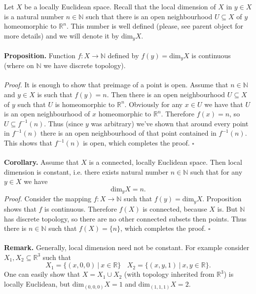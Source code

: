 \documentclass[12pt]{article}
\begin{document}
Let $X$ be a locally Euclidean space. Recall that the local dimension of $X$ in $y\in X$ is a natural number $n\in\mathbb{N}$ such that there is an open neighbourhood $U\subseteq X$ of $y$ homeomorphic to $\mathbb{R}^n$. This number is well defined (please, see parent object for more details) and we will denote it by $\mathrm{dim}_{y}X$.\\ \\
\textbf{Proposition.} Function $f:X\to\mathbb{N}$ defined by $f(y)=\mathrm{dim}_{y}X$ is continuous (where on $\mathbb{N}$ we have discrete topology).\\ \\
\textit{Proof.} It is enough to show that preimage of a point is open. Assume that $n\in\mathbb{N}$ and $y\in X$ is such that $f(y)=n$. Then there is an open neighbourhood $U\subseteq X$ of $y$ such that $U$ is homeomorphic to $\mathbb{R}^n$. Obviously for any $x\in U$ we have that $U$ is an open neighbourhood of $x$ homeomorphic to $\mathbb{R}^n$. Therefore $f(x)=n$, so $U\subseteq f^{-1}(n)$. Thus (since $y$ was arbitrary) we've shown that around every point in $f^{-1}(n)$ there is an open neighbourhood of that point contained in $f^{-1}(n)$. This shows that $f^{-1}(n)$ is open, which completes the proof. $\square$\\ \\
\textbf{Corollary.} Assume that $X$ is a connected, locally Euclidean space. Then local dimension is constant, i.e. there exists natural number $n\in\mathbb{N}$ such that for any $y\in X$ we have
$$\mathrm{dim}_{y}X=n.$$
\textit{Proof.} Consider the mapping $f:X\to\mathbb{N}$ such that $f(y)=\mathrm{dim}_{y}X$. Proposition shows that $f$ is continuous. Therefore $f(X)$ is connected, because $X$ is. But $\mathbb{N}$ has discrete topology, so there are no other connected subsets then points. Thus there is $n\in\mathbb{N}$ such that $f(X)=\{n\}$, which completes the proof. $\square$\\ \\
\textbf{Remark.} Generally, local dimension need not be constant. For example consider $X_1,X_2\subseteq\mathbb{R}^3$ such that
$$X_1=\{(x,0,0)\ |\ x\in\mathbb{R}\}\ \ \ \ X_2=\{(x,y,1)\ |\ x,y\in\mathbb{R}\}.$$
One can easily show that $X=X_1\cup X_2$ (with topology inherited from $\mathbb{R}^3$) is locally Euclidean, but $\mathrm{dim}_{(0,0,0)}X=1$ and $\mathrm{dim}_{(1,1,1)}X=2$.

\end{document}
